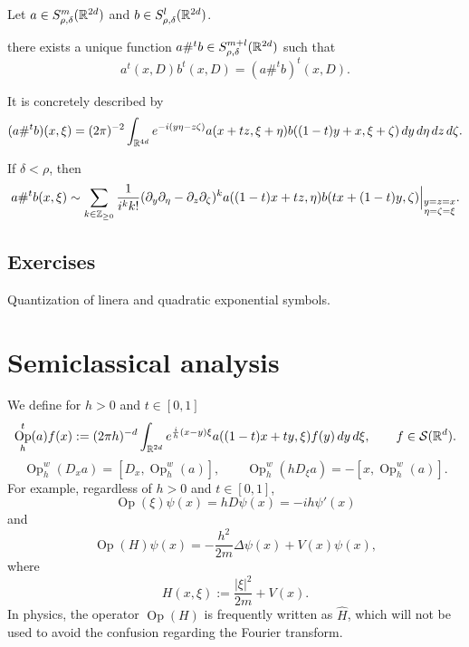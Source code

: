 \documentclass{../../large}
\DeclareMathOperator{\Op}{Op}
\begin{document}
\begin{prb}
Let $a\in S_{\rho,\delta}^m(\mathbb{R}^{2d})$ and $b\in S_{\rho,\delta}^l(\mathbb{R}^{2d})$.
\begin{parts}
\item there exists a unique function $a\#^tb\in S_{\rho,\delta}^{m+l}(\mathbb{R}^{2d})$ such that
\[a^t(x,D)b^t(x,D)=(a\#^tb)^t(x,D).\]
\item It is concretely described by
\[(a\#^tb)(x,\xi)=(2\pi)^{-2}\int_{\mathbb{R}^{4d}}e^{-i(y\eta-z\zeta)}a(x+tz,\xi+\eta)b((1-t)y+x,\xi+\zeta)\,dy\,d\eta\,dz\,d\zeta.\]
\item If $\delta<\rho$, then
\[a\#^tb(x,\xi)\sim\sum_{k\in\mathbb{Z}_{\ge0}}\frac1{i^kk!}(\partial_y\partial_\eta-\partial_z\partial_\zeta)^ka((1-t)x+tz,\eta)b(tx+(1-t)y,\zeta)\Bigr|_{\substack{y=z=x\\\eta=\zeta=\xi}}.\]
\end{parts}
\end{prb}



\begin{prb}
\end{prb}





\begin{prb}
\end{prb}

\section*{Exercises}
Quantization of linera and quadratic exponential symbols.

\chapter{Semiclassical analysis}

We define for $h>0$ and $t\in[0,1]$
\[\Op_h^t(a)f(x):=(2\pi h)^{-d}\int_{\R^{2d}}e^{\frac ih(x-y)\xi}a((1-t)x+ty,\xi)f(y)\,dy\,d\xi,\qquad f\in\cS(\R^d).\]
\[\Op_h^w(D_xa)=[D_x,\Op_h^w(a)],\qquad\Op_h^w(hD_\xi a)=-[x,\Op_h^w(a)].\]
For example, regardless of $h>0$ and $t\in[0,1]$,
\[\Op(\xi)\psi(x)=hD\psi(x)=-ih\psi'(x)\]
and
\[\Op(H)\psi(x)=-\frac{h^2}{2m}\Delta\psi(x)+V(x)\psi(x),\]
where
\[H(x,\xi):=\frac{|\xi|^2}{2m}+V(x).\]
In physics, the operator $\Op(H)$ is frequently written as $\hat H$, which will not be used to avoid the confusion regarding the Fourier transform.
\end{document}
